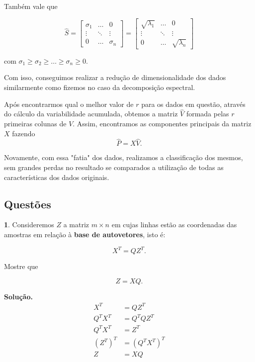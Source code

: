 \documentclass[a4paper, 12pt]{article}
\theoremstyle{definition}
\newtheorem{questao}{}
\newenvironment{solucao}{\noindent\textbf{Solução.}}{}
\theoremstyle{remark}
\begin{document}
Também vale que

\begin{equation*}
\hat{S} = 
\begin{bmatrix}
    \sigma_1 & \dots & 0 \\
    \vdots & \ddots & \vdots \\
    0 & \dots & \sigma_n
\end{bmatrix}
=
\begin{bmatrix}
    \sqrt{\lambda_1} & \dots & 0 \\
    \vdots & \ddots & \vdots \\
    0 & \dots & \sqrt{\lambda_n}
\end{bmatrix}
\end{equation*}

com $\sigma_1 \geq \sigma_2 \geq \dots \geq \sigma_n \geq 0$.

Com isso, conseguimos realizar a redução de dimensionalidade dos dados similarmente como fizemos no caso da decomposição espectral.

Após encontrarmos qual o melhor valor de $r$ para os dados em questão, através do cálculo da variabilidade acumulada, obtemos a matriz $\hat{V}$ formada pelas $r$ primeiras colunas de $V$. Assim, encontramos as componentes principais da matriz $X$ fazendo $$\hat{P} = X\hat{V}.$$

Novamente, com essa "fatia" dos dados, realizamos a classificação dos mesmos, sem grandes perdas no resultado se comparados a utilização de todas as características dos dados originais.

\subsection{Questões}

\begin{questao}
    Consideremos $Z$ a matriz $m \times n$ em cujas linhas estão as coordenadas das amostras em relação à \textbf{base de autovetores}, isto é:
    
    $$X^T = QZ^T.$$
    
    Mostre que
    
    $$Z = XQ.$$
\end{questao}

\begin{solucao}
\begin{align*}
X^T &= QZ^T \\
Q^TX^T &= Q^TQZ^T\\
Q^TX^T &= Z^T\\
(Z^T)^T &= (Q^TX^T)^T\\
Z &= XQ
\end{align*}

\end{solucao}
\end{document}

